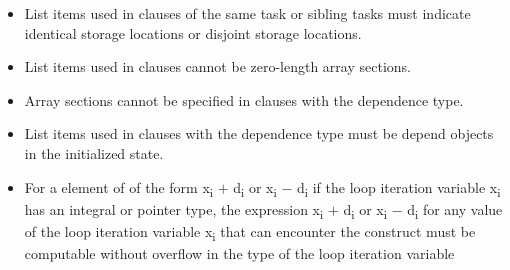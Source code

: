 \begin{itemize}
\item List items used in  clauses of the same task or 
      sibling tasks must indicate identical storage locations or 
      disjoint storage locations.
\item List items used in  clauses cannot be zero-length array sections.
\item Array sections cannot be specified in  clauses 
      with the  dependence type.
\item List items used in  clauses with the  
      dependence type must be depend objects in the initialized state.



\item For a  element of   of the form
      x\textsubscript{i} $+$ d\textsubscript{i} or 
      x\textsubscript{i} $-$ d\textsubscript{i} if the loop iteration variable
      x\textsubscript{i} has an integral or pointer type, the expression 
      x\textsubscript{i} $+$ d\textsubscript{i} or
      x\textsubscript{i} $-$ d\textsubscript{i} for any value of the loop 
      iteration variable x\textsubscript{i} that can encounter the  
      construct must be computable without overflow in the type of the loop 
      iteration variable


\end{itemize}
